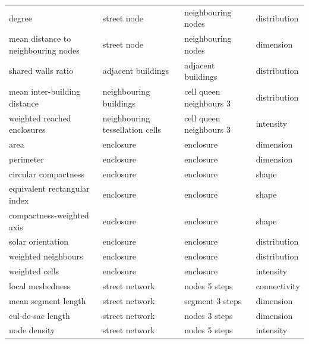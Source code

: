 \begin{longtable}{p{5cm}p{4cm}p{4cm}l}
                                degree &                     street node &         neighbouring nodes & distribution \\
    mean distance to neighbouring nodes &                     street node &         neighbouring nodes &    dimension \\
                    shared walls ratio &             adjacent buildings  &        adjacent buildings  & distribution \\
        mean inter-building distance &          neighbouring buildings &    cell queen neighbours 3 & distribution \\
            weighted reached enclosures & neighbouring tessellation cells &    cell queen neighbours 3 &    intensity \\
                                area &                       enclosure &                  enclosure &    dimension \\
                            perimeter &                       enclosure &                  enclosure &    dimension \\
                circular compactness &                       enclosure &                  enclosure &        shape \\
        equivalent rectangular index &                       enclosure &                  enclosure &        shape \\
            compactness-weighted axis &                       enclosure &                  enclosure &        shape \\
                    solar orientation &                       enclosure &                  enclosure & distribution \\
                    weighted neighbours &                       enclosure &                  enclosure & distribution \\
                        weighted cells &                       enclosure &                  enclosure &    intensity \\
                    local meshedness &                  street network &              nodes 5 steps & connectivity \\
                    mean segment length &                  street network &            segment 3 steps &    dimension \\
                    cul-de-sac length &                  street network &              nodes 3 steps &    dimension \\
                        node density &                  street network &              nodes 5 steps &    intensity \\

\end{longtable}
